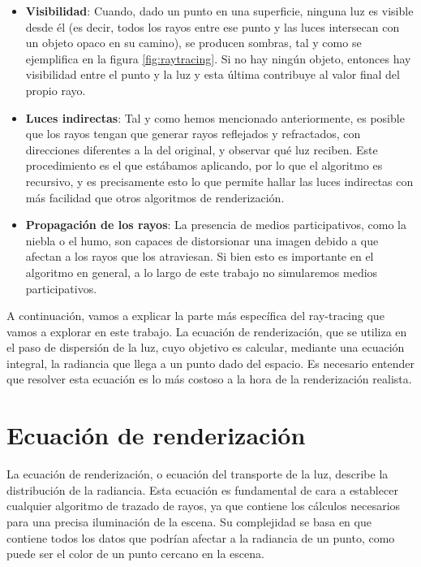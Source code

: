 \documentclass{scrbook}
\begin{document}
\begin{itemize}
	\item \textbf{Visibilidad}: Cuando, dado un punto en una superficie, ninguna luz es visible desde él (es decir, todos los rayos entre ese punto y las luces intersecan con un objeto opaco en su camino), se producen sombras, tal y como se ejemplifica en la figura \ref{fig:raytracing}. Si no hay ningún objeto, entonces hay visibilidad entre el punto y la luz y esta última contribuye al valor final del propio rayo. 
	
	\item \textbf{Luces indirectas}: Tal y como hemos mencionado anteriormente, es posible que los rayos tengan que generar rayos reflejados y refractados, con direcciones diferentes a la del original, y observar qué luz reciben. Este procedimiento es el que estábamos aplicando, por lo que el algoritmo es recursivo, y es precisamente esto lo que permite hallar las luces indirectas con más facilidad que otros algoritmos de renderización. 
	
	\item \textbf{Propagación de los rayos}: La presencia de medios participativos, como la niebla o el humo, son capaces de distorsionar una imagen debido a que afectan a los rayos que los atraviesan. Si bien esto es importante en el algoritmo en general, a lo largo de este trabajo no simularemos medios participativos.
\end{itemize}

A continuación, vamos a explicar la parte más específica del ray-tracing que vamos a explorar en este trabajo. La ecuación de renderización, que se utiliza en el paso de dispersión de la luz, cuyo objetivo es calcular, mediante una ecuación integral, la radiancia que llega a un punto dado del espacio. Es necesario entender que resolver esta ecuación es lo más costoso a la hora de la renderización realista.

\section{Ecuación de renderización}
\label{rendering}
La ecuación de renderización, o ecuación del transporte de la luz, describe la distribución de la radiancia. Esta ecuación es fundamental de cara a establecer cualquier algoritmo de trazado de rayos, ya que contiene los cálculos necesarios para una precisa iluminación de la escena. Su complejidad se basa en que contiene todos los datos que podrían afectar a la radiancia de un punto, como puede ser el color de un punto cercano en la escena. 
\end{document}
